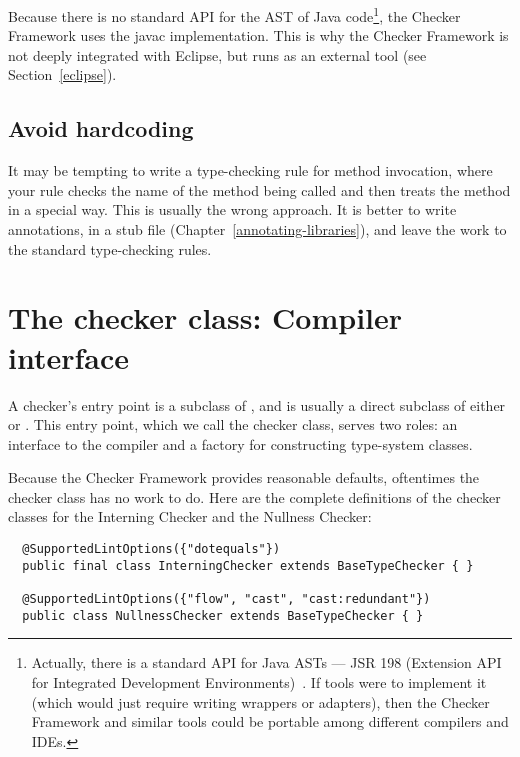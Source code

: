 Because there is no standard API for the AST of Java code\footnote{Actually,
there is a standard API for Java ASTs --- JSR 198 (Extension API for
Integrated Development Environments)~\cite{JSR198}.  If tools were to
implement it
(which would just require writing wrappers or adapters), then the Checker
Framework and similar tools could be portable among different compilers and
IDEs.}, the Checker
Framework uses the javac implementation.  This is why the Checker Framework
is not deeply integrated with Eclipse, but runs as an external tool (see
Section~\ref{eclipse}).


\subsection{Avoid hardcoding\label{avoid-hardcoding}}

It may be tempting to write a type-checking rule for method invocation,
where your rule checks the name of the method being called and then treats
the method in a special way.  This is usually the wrong approach.  It
is better to write annotations, in a stub file
(Chapter~\ref{annotating-libraries}), and leave the work to the standard
type-checking rules.


\section{The checker class:  Compiler interface\label{writing-compiler-interface}}

A checker's entry point is a subclass of
, and is usually a direct subclass
of either  or
.
This entry
point, which we call the checker class, serves two
roles:  an interface to the compiler and a factory for constructing
type-system classes.

Because the Checker Framework provides reasonable defaults, oftentimes the
checker class has no work to do.  Here are the complete definitions of the
checker classes for the Interning Checker and the Nullness Checker:

\begin{Verbatim}
  @SupportedLintOptions({"dotequals"})
  public final class InterningChecker extends BaseTypeChecker { }

  @SupportedLintOptions({"flow", "cast", "cast:redundant"})
  public class NullnessChecker extends BaseTypeChecker { }
\end{Verbatim}

